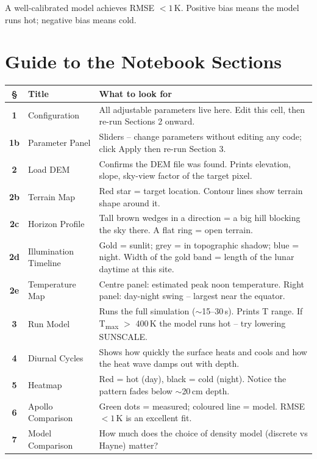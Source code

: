 \documentclass[12pt, a4paper]{article}
\begin{document}
A well-calibrated model achieves RMSE $< 1$\,K.
Positive bias means the model runs hot; negative bias means cold.

\section{Guide to the Notebook Sections}

\begin{center}
\renewcommand{\arraystretch}{1.3}
\begin{tabular}{>{\bfseries}c l p{8.2cm}}
\toprule
\S & Title & What to look for \\
\midrule
1  & Configuration         & All adjustable parameters live here. Edit this cell, then re-run Sections 2 onward. \\
1b & Parameter Panel       & Sliders -- change parameters without editing any code; click Apply then re-run Section 3. \\
2  & Load DEM              & Confirms the DEM file was found. Prints elevation, slope, sky-view factor of the target pixel. \\
2b & Terrain Map           & Red star = target location. Contour lines show terrain shape around it. \\
2c & Horizon Profile       & Tall brown wedges in a direction = a big hill blocking the sky there. A flat ring = open terrain. \\
2d & Illumination Timeline & Gold = sunlit; grey = in topographic shadow; blue = night. Width of the gold band = length of the lunar daytime at this site. \\
2e & Temperature Map       & Centre panel: estimated peak noon temperature. Right panel: day-night swing -- largest near the equator. \\
3  & Run Model             & Runs the full simulation ($\sim$15--30\,s). Prints T range. If T\textsubscript{max} $>$ 400\,K the model runs hot -- try lowering SUNSCALE. \\
4  & Diurnal Cycles        & Shows how quickly the surface heats and cools and how the heat wave damps out with depth. \\
5  & Heatmap               & Red = hot (day), black = cold (night). Notice the pattern fades below $\sim$20\,cm depth. \\
6  & Apollo Comparison     & Green dots = measured; coloured line = model. RMSE $< 1$\,K is an excellent fit. \\
7  & Model Comparison      & How much does the choice of density model (discrete vs Hayne) matter? \\

\end{tabular}
\end{center}
\end{document}
